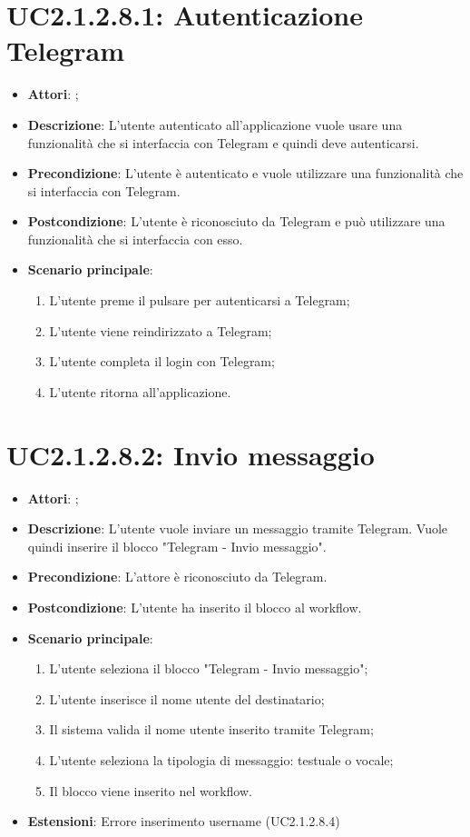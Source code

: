 \section{UC2.1.2.8.1: Autenticazione Telegram}
\label{UC2.1.2.8.1}
\begin{itemize}
	\item \textbf{Attori}: ;
	\item \textbf{Descrizione}: L'utente autenticato all'applicazione vuole usare una funzionalità che si interfaccia con Telegram e quindi deve autenticarsi. 
	\item \textbf{Precondizione}: L'utente è autenticato e vuole utilizzare una funzionalità che si interfaccia con Telegram. 
	\item \textbf{Postcondizione}: L'utente è riconosciuto da Telegram e può utilizzare una funzionalità che si interfaccia con esso. 
	\item \textbf{Scenario principale}:
	\begin{enumerate} \item L'utente preme il pulsare per autenticarsi a Telegram;  \item  L'utente viene reindirizzato a Telegram;  \item  L'utente completa il login con Telegram;  \item  L'utente ritorna all'applicazione.\end{enumerate}
\end{itemize}

\section{UC2.1.2.8.2: Invio messaggio}
\label{UC2.1.2.8.2}
\begin{itemize}
	\item \textbf{Attori}: ;
	\item \textbf{Descrizione}: L'utente vuole inviare un messaggio tramite Telegram. Vuole quindi inserire il blocco "Telegram - Invio messaggio".
	\item \textbf{Precondizione}: L'attore è riconosciuto da Telegram.
	\item \textbf{Postcondizione}: L'utente ha inserito il blocco al workflow.
	\item \textbf{Scenario principale}:
	\begin{enumerate} \item L'utente seleziona il blocco "Telegram - Invio messaggio";  \item  L'utente inserisce il nome utente del destinatario;  \item  Il sistema valida il nome utente inserito tramite Telegram;  \item  L'utente seleziona la tipologia di messaggio: testuale o vocale;  \item  Il blocco viene inserito nel workflow.\end{enumerate}
	\item \textbf{Estensioni}:
	Errore inserimento username (UC2.1.2.8.4)
\end{itemize}

